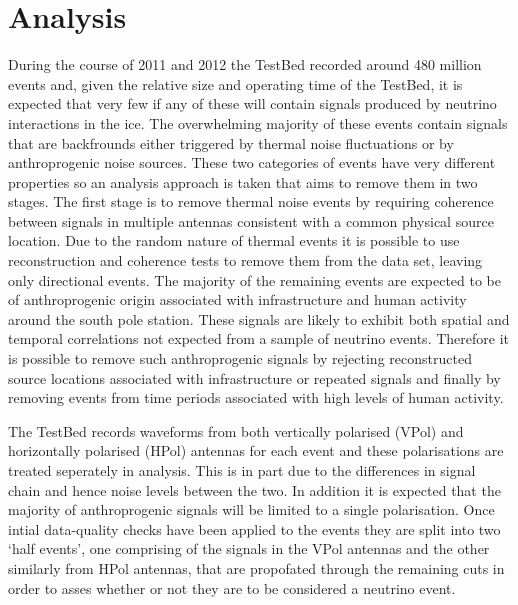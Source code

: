 \chapter{Analysis}
\label{chap:Analysis}

During the course of 2011 and 2012 the TestBed recorded around 480 million events and, given the relative size and operating time of the TestBed, it is expected that very few if any of these will contain signals produced by neutrino interactions in the ice. The overwhelming majority of these events contain signals that are backfrounds either triggered by thermal noise fluctuations or by anthroprogenic noise sources. These two categories of events have very different properties so an analysis approach is taken that aims to remove them in two stages. The first stage is to remove thermal noise events by requiring coherence between signals in multiple antennas consistent with a common physical source location. Due to the random nature of thermal events it is possible to use reconstruction and coherence tests to remove them from the data set, leaving only directional events. The majority of the remaining events are expected to be of anthroprogenic origin associated with infrastructure and human activity around the south pole station. These signals are likely to exhibit both spatial and temporal correlations not expected from a sample of neutrino events. Therefore it is possible to remove such anthroprogenic signals by rejecting reconstructed source locations associated with infrastructure or repeated signals and finally by removing events from time periods associated with high levels of human activity.

The TestBed records waveforms from both vertically polarised (VPol) and horizontally polarised (HPol) antennas for each event and these polarisations are treated seperately in analysis. This is in part due to the differences in signal chain and hence noise levels between the two. In addition it is expected that the majority of anthroprogenic signals will be limited to a single polarisation. Once intial data-quality checks have been applied to the events they are split into two `half events', one comprising of the signals in the VPol antennas and the other similarly from HPol antennas, that are propofated through the remaining cuts in order to asses whether or not they are to be considered a neutrino event.


